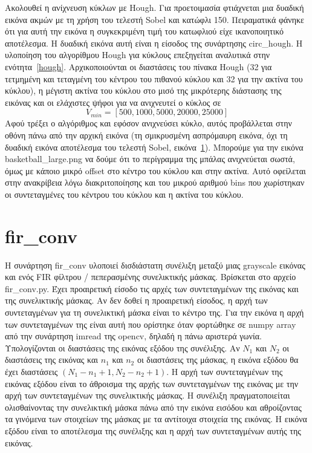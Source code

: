 \documentclass{article}
\begin{document}
Ακολουθεί η ανίχνευση κύκλων με Hough. Για προετοιμασία φτιάχνεται μια δυαδική
εικόνα ακμών με τη χρήση του τελεστή Sobel και κατώφλι 150. Πειραματικά 
φάνηκε ότι για αυτή την εικόνα η συγκεκριμένη τιμή του κατωφλιού είχε ικανοποιητικό
αποτέλεσμα. Η δυαδική εικόνα αυτή είναι η είσοδος της συνάρτησης 
circ\_hough. Η υλοποίηση του αλγορίθμου Hough για κύκλους επεξηγείται αναλυτικά 
στην ενότητα~\ref{hough}. 
Αρχικοποιούνται οι διαστάσεις του πίνακα Hough (32 για τετμημένη και τεταγμένη
του κέντρου του πιθανού κύκλου και 32 για την ακτίνα του κύκλου), η μέγιστη 
ακτίνα του κύκλου στο μισό της μικρότερης διάστασης της εικόνας και οι ελάχιστες
ψήφοι για να ανιχνευτεί ο κύκλος σε 
\[V_{min} = \left[500, 1000, 5000, 20000, 25000\right]\]
Αφού τρέξει ο
αλγόριθμος και εφόσον ανιχνεύσει κύκλο, αυτός προβάλλεται στην οθόνη πάνω 
από την αρχική εικόνα (τη σμικρυσμένη ασπρόμαυρη εικόνα, όχι τη δυαδική εικόνα
αποτέλεσμα του τελεστή Sobel, εικόνα~\ref{}). Μπορούμε για την εικόνα 
basketball\_large.png να δούμε ότι το περίγραμμα της μπάλας ανιχνεύεται σωστά,
όμως με κάποιο μικρό offset στο κέντρο του κύκλου και στην ακτίνα. Αυτό οφείλεται
στην ανακρίβεια λόγω διακριτοποίησης και του μικρού αριθμού bins που χωρίστηκαν 
οι συντεταγμένες του κέντρου του κύκλου και η ακτίνα του κύκλου.

\section{fir\_conv}
Η συνάρτηση fir\_conv υλοποιεί δισδιάστατη συνέλιξη μεταξύ μιας grayscale
εικόνας και ενός FIR φίλτρου / πεπερασμένης συνελικτικής μάσκας. Βρίσκεται στο 
αρχείο fir\_conv.py. Έχει προαιρετική είσοδο τις αρχές των συντεταγμένων 
της εικόνας και της συνελικτικής μάσκας. Αν δεν δοθεί η προαιρετική είσοδος, η αρχή 
των συντεταγμένων για τη συνελικτική μάσκα είναι το κέντρο της. Για την εικόνα
η αρχή των συντεταγμένων της είναι αυτή που ορίστηκε όταν φορτώθηκε σε numpy 
array από την συνάρτηση imread της opencv, δηλαδή η πάνω αριστερά γωνία.
Υπολογίζονται οι διαστάσεις της εικόνας εξόδου της συνέλιξης.
Αν $N_1$ και $N_2$ οι διαστάσεις της εικόνας και $n_1$ και $n_2$ οι διαστάσεις
της μάσκας, η εικόνα εξόδου θα έχει διαστάσεις $(N_1 - n_1 + 1, N_2 - n_2 + 1)$.
Η αρχή των συντεταγμένων της εικόνας εξόδου είναι το άθροισμα της αρχής των συντεταγμένων της 
εικόνας με την αρχή των συντεταγμένων της συνελικτικής μάσκας. Η συνέλιξη 
πραγματοποιείται ολισθαίνοντας την συνελικτική μάσκα πάνω από την εικόνα εισόδου
και αθροίζοντας τα γινόμενα των στοιχείων της μάσκας με τα αντίτοιχα στοιχεία 
της εικόνας. Η εικόνα εξόδου είναι το αποτέλεσμα της συνέλιξης και η αρχή των 
συντεταγμένων αυτής της εικόνας.
\end{document}
